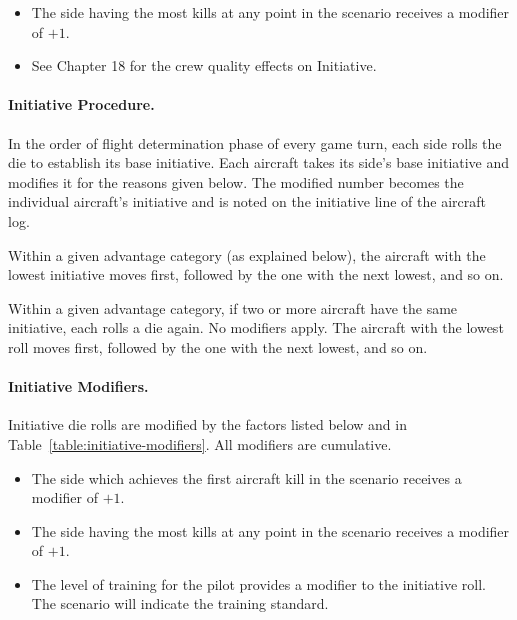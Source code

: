 {\begin{itemize}
    \item{} The side having the most kills at any point in the scenario receives a modifier of $+1$.

    \item{} See Chapter 18 for the crew quality effects on Initiative.
\end{itemize}
}{
\paragraph{Initiative Procedure.} In the order of flight determination phase of every game turn, each side rolls the die to establish its base initiative. Each aircraft takes its side’s base initiative and modifies it for the reasons given below. The modified number becomes the individual aircraft’s initiative and is noted on the initiative line of the aircraft log.

Within a given advantage category (as explained below), the aircraft with the lowest initiative moves first, followed by the one with the next lowest, and so on. 

Within a given advantage category, if two or more aircraft have the same initiative, each rolls a die again. No modifiers apply. The aircraft with the lowest roll moves first, followed by the one with the next lowest, and so on.

\paragraph{Initiative Modifiers.} Initiative die rolls are modified by the factors listed below and in Table~\ref{table:initiative-modifiers}. All modifiers are cumulative.


\begin{itemize}

   \item{} The side which achieves the first aircraft kill in the scenario receives a modifier of $+1$.

    \item{} The side having the most kills at any point in the scenario receives a modifier of $+1$.

    \item{} The level of training for the pilot provides a modifier to the initiative roll. The scenario will indicate the training standard.


\end{itemize}}
